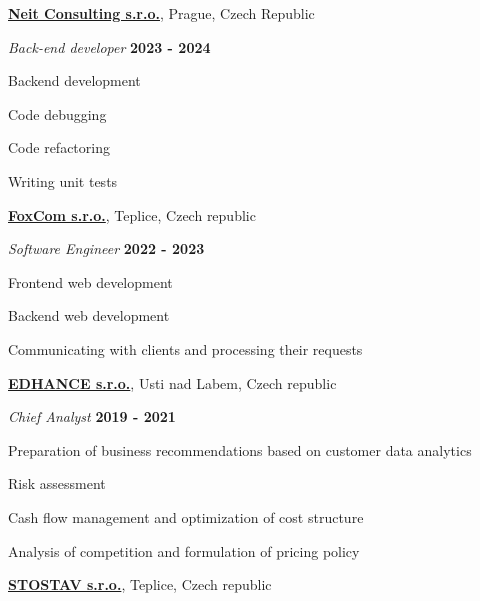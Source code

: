 \documentclass[10pt]{article}
\newenvironment{outerlist}[0]%
        {\begin{itemize}}
	{\end{itemize}
         \vspace{-.6\baselineskip}}
\newenvironment{innerlist}[0]%
        {\begin{compactitem}}
	{\end{compactitem}}
\newcommand{\blankline}{\quad\pagebreak[2]}
\begin{document}
\href{http://www.neit.cz}{\textbf{Neit Consulting s.r.o.}}, 
Prague, Czech Republic

\begin{outerlist}
	\item[] \textit{Back-end developer}%
		\hfill \textbf{2023 - 2024}
	\begin{innerlist}
		\item Backend development
		\item Code debugging
		\item Code refactoring	
		\item Writing unit tests	
		
	\end{innerlist}
\end{outerlist}
\blankline

\href{http://www.foxcom.eu}{\textbf{FoxCom s.r.o.}}, 
Teplice, Czech republic

\begin{outerlist}
	\item[] \textit{Software Engineer}%
		\hfill \textbf{2022 - 2023}
	\begin{innerlist}
		\item Frontend web development
		\item Backend web development
		\item Communicating with clients and processing their requests	
		
	\end{innerlist}
\end{outerlist}
\blankline


\href{http://www.edhance.cz}{\textbf{EDHANCE s.r.o.}}, 
Usti nad Labem, Czech republic

\begin{outerlist}
	\item[] \textit{Chief Analyst}%
		\hfill \textbf{2019 - 2021}
	\begin{innerlist}
		\item Preparation of business recommendations based on customer data analytics
		\item Risk assessment
		\item Cash flow management and optimization of cost structure
		\item Analysis of competition and formulation of pricing policy
		
	\end{innerlist}
\end{outerlist}
\blankline

\href{http://www.stostav.cz}{\textbf{STOSTAV s.r.o.}}, 
Teplice, Czech republic
\end{document}
